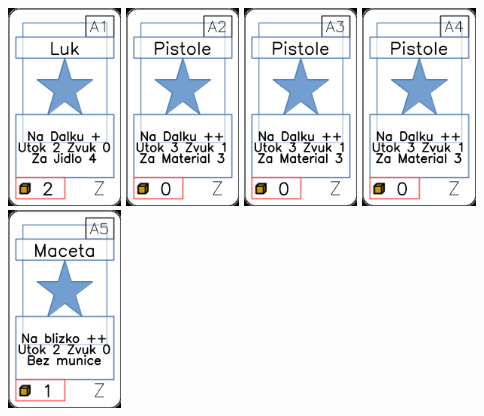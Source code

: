 \documentclass[a4paper]{article}
\begin{document}
	\includegraphics[width=3.0cm]{img-1_90}
	\includegraphics[width=3.0cm]{img-1_91}
	\includegraphics[width=3.0cm]{img-1_92}
	\includegraphics[width=3.0cm]{img-1_93}
	\includegraphics[width=3.0cm]{img-1_94}
\end{document}
